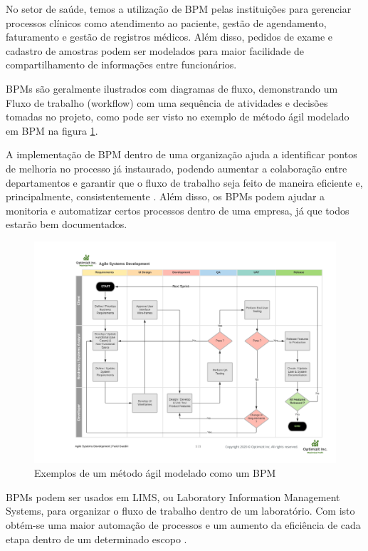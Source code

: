 

No setor de saúde, temos a utilização de BPM pelas instituições para gerenciar processos clínicos como atendimento ao paciente, gestão de agendamento, faturamento e gestão de registros médicos. Além disso, pedidos de exame e cadastro de amostras podem ser modelados para maior facilidade de compartilhamento de informações entre funcionários.


BPMs são geralmente ilustrados com diagramas de fluxo, demonstrando um Fluxo de trabalho (workflow) com uma sequência de atividades e decisões tomadas no projeto, como pode ser visto no exemplo de método ágil modelado em BPM na figura \ref{fig:bpm}.

A implementação de BPM dentro de uma organização ajuda a identificar pontos de melhoria no processo já instaurado, podendo aumentar a colaboração entre departamentos e garantir que o fluxo de trabalho seja feito de maneira eficiente e, principalmente, consistentemente \R.
Além disso, os BPMs podem ajudar a monitoria e automatizar certos processos dentro de uma empresa, já que todos estarão bem documentados. \R

\begin{figure}
    \centering
    \includegraphics[width=1\textwidth]{imgs/BPM/sprint as bpm.png}
    \caption{Exemplos de um método ágil modelado como um BPM}
    \label{fig:bpm}
\end{figure}

BPMs podem ser usados em LIMS, ou Laboratory Information Management Systems, para organizar o fluxo de trabalho dentro de um laboratório. Com isto obtém-se uma maior automação de processos e um aumento da eficiência de cada etapa dentro de um determinado escopo \cite{Key2011LIMS:Systems}.

